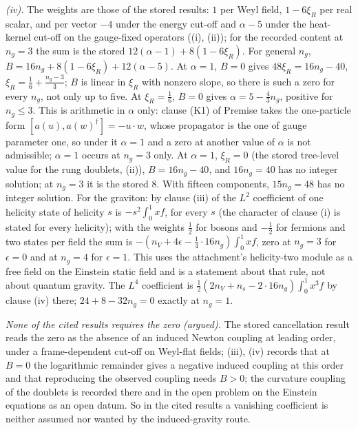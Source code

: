 \emph{(iv).} The weights are those of the stored results: $1$ per Weyl field, $1 - 6\xi_{R}$ per real scalar, and per vector $-4$ under the energy cut-off and $\alpha - 5$ under the heat-kernel cut-off on the gauge-fixed operators ((i), (ii)); for the recorded content at $n_{g} = 3$ the sum is the stored $12(\alpha - 1) + 8(1 - 6\xi_{R})$. For general $n_{g}$, $B = 16n_{g} + 8(1 - 6\xi_{R}) + 12(\alpha - 5)$. At $\alpha = 1$, $B = 0$ gives $48\xi_{R} = 16n_{g} - 40$, $\xi_{R} = \tfrac16 + \tfrac{n_{g} - 3}{3}$; $B$ is linear in $\xi_{R}$ with nonzero slope, so there is such a zero for every $n_{g}$, not only up to five. At $\xi_{R} = \tfrac16$, $B = 0$ gives $\alpha = 5 - \tfrac43 n_{g}$, positive for $n_{g} \le 3$. This is arithmetic in $\alpha$ only: clause (K1) of Premise  takes the one-particle form $[a(u), a(w)^{\dagger}] = -u\cdot w$, whose propagator is the one of gauge parameter one, so under it $\alpha = 1$ and a zero at another value of $\alpha$ is not admissible; $\alpha = 1$ occurs at $n_{g} = 3$ only. At $\alpha = 1$, $\xi_{R} = 0$ (the stored tree-level value for the rung doublets, (ii)), $B = 16n_{g} - 40$, and $16n_{g} = 40$ has no integer solution; at $n_{g} = 3$ it is the stored $8$. With fifteen components, $15n_{g} = 48$ has no integer solution. For the graviton: by clause (iii) of  the $L^{2}$ coefficient of one helicity state of helicity $s$ is $-s^{2}\int_{0}^{1}xf$, for every $s$ (the character of clause (i) is stated for every helicity); with the weights $\tfrac12$ for bosons and $-\tfrac12$ for fermions and two states per field the sum is $-(n_{V} + 4\epsilon - \tfrac14 \cdot 16n_{g})\int_{0}^{1}xf$, zero at $n_{g} = 3$ for $\epsilon = 0$ and at $n_{g} = 4$ for $\epsilon = 1$. This uses the attachment's helicity-two module as a free field on the Einstein static field and is a statement about that rule, not about quantum gravity. The $L^{4}$ coefficient is $\tfrac12(2n_{V} + n_{s} - 2 \cdot 16n_{g})\int_{0}^{1}x^{3}f$ by clause (iv) there; $24 + 8 - 32n_{g} = 0$ exactly at $n_{g} = 1$.

\emph{None of the cited results requires the zero (argued).} The stored cancellation result reads the zero as the absence of an induced Newton coupling at leading order, under a frame-dependent cut-off on Weyl-flat fields; (iii), (iv) records that at $B = 0$ the logarithmic remainder gives a negative induced coupling at this order and that reproducing the observed coupling needs $B > 0$; the curvature coupling of the doublets is recorded there and in the open problem on the Einstein equations as an open datum. So in the cited results a vanishing coefficient is neither assumed nor wanted by the induced-gravity route.


